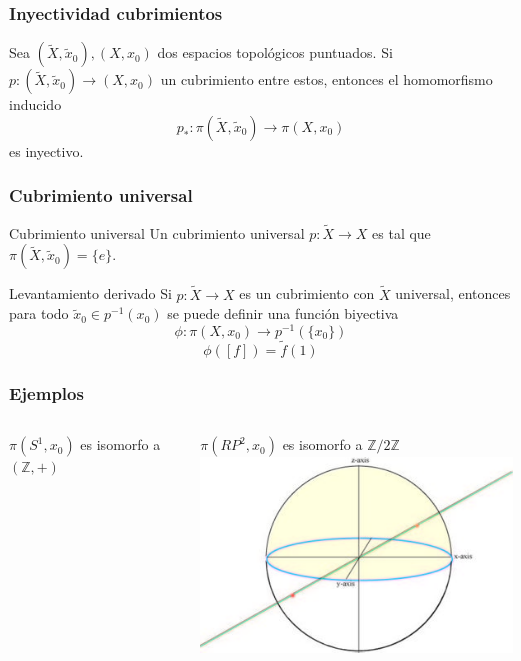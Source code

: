 \documentclass[xetex,mathserif,serif]{beamer}
\begin{document}
  \begin{frame}
    \frametitle{Inyectividad cubrimientos}
    \begin{block}{}
      Sea \(\left( \tilde X, \tilde x_0 \right), \left( X, x_0 \right)\)
      dos espacios topológicos puntuados. Si \(p : \left( \tilde X,
        \tilde x_0 \right) \to \left( X, x_0 \right)\) un cubrimiento
      entre estos, entonces el homomorfismo inducido
      \[ p_* : \pi \left( \tilde X, \tilde x_0 \right) \longrightarrow
        \pi \left( X, x_0 \right)\] es inyectivo.
    \end{block}
  \end{frame}

  \begin{frame}
    \frametitle{Cubrimiento universal}
    \begin{block}{Cubrimiento universal}
      Un cubrimiento universal \(p : \tilde X \to X\) es tal que \(\pi
      (\tilde X, \tilde x_0) = \{e\}\).
    \end{block}

    \begin{block}{Levantamiento derivado}
      Si \(p : \tilde X \to X\) es un cubrimiento con \(\tilde X\)
      universal, entonces para todo \(\tilde x_0 \in p^{-1} (x_0)\) se
      puede definir una función biyectiva
      \[ \phi : \pi (X, x_0) \to p^{-1} (\{x_0\}) \]
      \[ \phi \left( [f] \right) = \tilde f (1) \]
    \end{block}
  \end{frame}

  \begin{frame}
    \frametitle{Ejemplos}
  \begin{columns}
    \begin{column}{0.5\textwidth}
      \(\pi (S^1,x_0)\) es isomorfo a \((\mathbb Z, +)\) \\
      \centering
    \end{column}

    \begin{column}{0.5\textwidth}
      \(\pi (RP^2, x_0)\) es isomorfo a \(\mathbb Z / 2 \mathbb Z\) \\
      \centering
      \includegraphics[scale=0.45]{./imag/rpsphere.jpg}
    \end{column}
  \end{columns}
  \end{frame}
\end{document}
